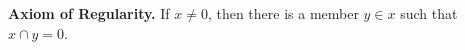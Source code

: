 \textbf{Axiom of Regularity.} If $x \neq 0$, then there is a member $y \in x$ such that $x \cap y = 0$.
